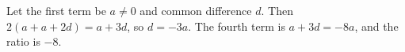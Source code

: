 Let the first term be $a\ne0$ and common difference $d$. Then $2(a+a+2d)=a+3d$, so $d=-3a$. The fourth term is $a+3d=-8a$, and the ratio is $\boxed{-8}$.
